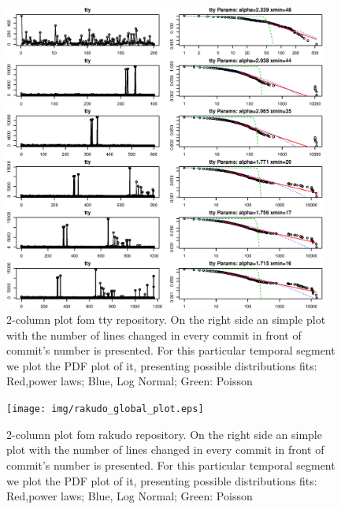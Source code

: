 \documentclass[conference]{IEEEtran}
\begin{document}
\begin{figure}[htbp]
	\centerline{\includegraphics[width=0.95\textwidth]{img/tty_global.eps}}
	\caption{2-column plot fom tty repository. On the right side an simple plot with the number of lines changed in every commit in front of commit's number is presented. For this particular temporal segment we plot the PDF plot of it, presenting possible distributions fits: Red,power laws; Blue, Log Normal; Green: Poisson}
	\label{fig:tty}
\end{figure}

\begin{figure}[htbp]
	\centerline{\texttt{[image: img/rakudo\_global\_plot.eps]}}
	\caption{2-column plot fom rakudo repository. On the right side an simple plot with the number of lines changed in every commit in front of commit's number is presented. For this particular temporal segment we plot the PDF plot of it, presenting possible distributions fits: Red,power laws; Blue, Log Normal; Green: Poisson}
	\label{fig:rakudo}
\end{figure}
\end{document}
